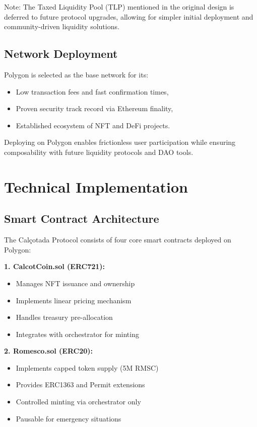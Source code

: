 \documentclass[conference]{IEEEtran}
\begin{document}
Note: The Taxed Liquidity Pool (TLP) mentioned in the original design is deferred to future protocol upgrades, allowing for simpler initial deployment and community-driven liquidity solutions.


\subsection{Network Deployment}

Polygon is selected as the base network for its:
\begin{itemize}
    \item Low transaction fees and fast confirmation times,
    \item Proven security track record via Ethereum finality,
    \item Established ecosystem of NFT and DeFi projects.
\end{itemize}

Deploying on Polygon enables frictionless user participation while ensuring composability with future liquidity protocols and DAO tools.



\section{Technical Implementation}

\subsection{Smart Contract Architecture}

The Calçotada Protocol consists of four core smart contracts deployed on Polygon:

\textbf{1. CalcotCoin.sol (ERC721):}
\begin{itemize}
    \item Manages NFT issuance and ownership
    \item Implements linear pricing mechanism
    \item Handles treasury pre-allocation
    \item Integrates with orchestrator for minting
\end{itemize}

\textbf{2. Romesco.sol (ERC20):}
\begin{itemize}
    \item Implements capped token supply (5M RMSC)
    \item Provides ERC1363 and Permit extensions
    \item Controlled minting via orchestrator only
    \item Pausable for emergency situations
\end{itemize}
\end{document}
